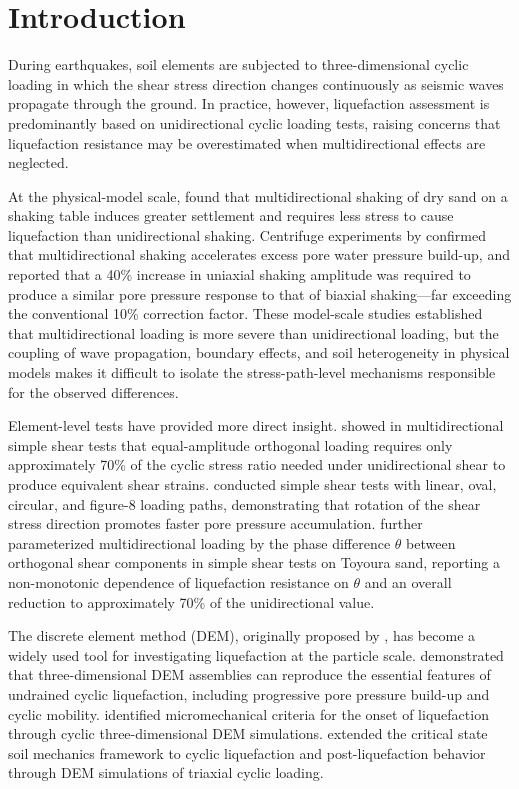\section{Introduction}
\label{sec:introduction}

During earthquakes, soil elements are subjected to three-dimensional cyclic loading in which the shear stress direction changes continuously as seismic waves propagate through the ground. In practice, however, liquefaction assessment is predominantly based on unidirectional cyclic loading tests, raising concerns that liquefaction resistance may be overestimated when multidirectional effects are neglected.

At the physical-model scale, \citet{Pyke1975} found that multidirectional shaking of dry sand on a shaking table induces greater settlement and requires less stress to cause liquefaction than unidirectional shaking. Centrifuge experiments by \citet{SuLi2008} confirmed that multidirectional shaking accelerates excess pore water pressure build-up, and \citet{ElShafee2017} reported that a 40\% increase in uniaxial shaking amplitude was required to produce a similar pore pressure response to that of biaxial shaking---far exceeding the conventional 10\% correction factor. These model-scale studies established that multidirectional loading is more severe than unidirectional loading, but the coupling of wave propagation, boundary effects, and soil heterogeneity in physical models makes it difficult to isolate the stress-path-level mechanisms responsible for the observed differences.

Element-level tests have provided more direct insight. \citet{IshiharaYamazaki1980} showed in multidirectional simple shear tests that equal-amplitude orthogonal loading requires only approximately 70\% of the cyclic stress ratio needed under unidirectional shear to produce equivalent shear strains. \citet{Kammerer2005} conducted simple shear tests with linear, oval, circular, and figure-8 loading paths, demonstrating that rotation of the shear stress direction promotes faster pore pressure accumulation. \citet{JinGuo2021} further parameterized multidirectional loading by the phase difference $\theta$ between orthogonal shear components in simple shear tests on Toyoura sand, reporting a non-monotonic dependence of liquefaction resistance on $\theta$ and an overall reduction to approximately 70\% of the unidirectional value.

The discrete element method (DEM), originally proposed by \citet{Cundall1979}, has become a widely used tool for investigating liquefaction at the particle scale. \citet{Kuhn2014} demonstrated that three-dimensional DEM assemblies can reproduce the essential features of undrained cyclic liquefaction, including progressive pore pressure build-up and cyclic mobility. \citet{Martin2020} identified micromechanical criteria for the onset of liquefaction through cyclic three-dimensional DEM simulations. \citet{Rahman2021} extended the critical state soil mechanics framework to cyclic liquefaction and post-liquefaction behavior through DEM simulations of triaxial cyclic loading.

